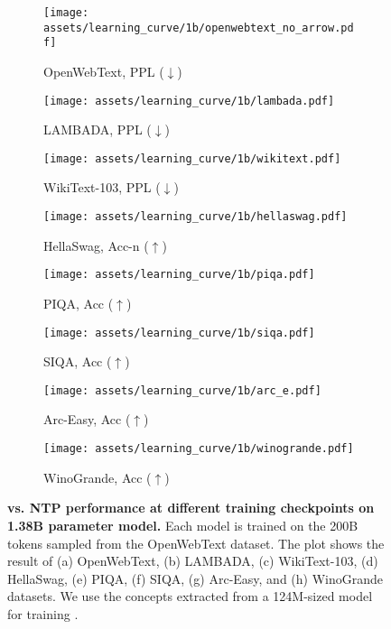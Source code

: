\begin{figure*}[t]
\centering\small

\begin{subfigure}{0.245\textwidth}
    \texttt{[image: assets/learning\_curve/1b/openwebtext\_no\_arrow.pdf]}
    \caption{OpenWebText, PPL ($\downarrow$)}
\end{subfigure}
\begin{subfigure}{0.245\textwidth}
    \texttt{[image: assets/learning\_curve/1b/lambada.pdf]}
    \caption{LAMBADA, PPL ($\downarrow$)}
\end{subfigure}
\begin{subfigure}{0.245\textwidth}
    \texttt{[image: assets/learning\_curve/1b/wikitext.pdf]}
    \caption{WikiText-103, PPL ($\downarrow$)}
\end{subfigure}
\begin{subfigure}{0.245\textwidth}
    \texttt{[image: assets/learning\_curve/1b/hellaswag.pdf]}
    \caption{HellaSwag, Acc-n ($\uparrow$)}
\end{subfigure}
\begin{subfigure}{0.245\textwidth}
    \texttt{[image: assets/learning\_curve/1b/piqa.pdf]}
    \caption{PIQA, Acc ($\uparrow$)}
\end{subfigure}
\begin{subfigure}{0.245\textwidth}
    \texttt{[image: assets/learning\_curve/1b/siqa.pdf]}
    \caption{SIQA, Acc ($\uparrow$)}
\end{subfigure}
\begin{subfigure}{0.245\textwidth}
    \texttt{[image: assets/learning\_curve/1b/arc\_e.pdf]}
    \caption{Arc-Easy, Acc ($\uparrow$)}
\end{subfigure}
\begin{subfigure}{0.245\textwidth}
    \texttt{[image: assets/learning\_curve/1b/winogrande.pdf]}
    \caption{WinoGrande, Acc ($\uparrow$)}
\end{subfigure}
\caption{
\textbf{\sname vs. NTP performance at different training checkpoints on 1.38B parameter model.} Each model is trained on the 200B tokens sampled from the OpenWebText dataset. The plot shows the result of (a) OpenWebText, (b) LAMBADA, (c) WikiText-103, (d) HellaSwag, (e) PIQA, (f) SIQA, (g) Arc-Easy, and (h) WinoGrande datasets. We use the concepts extracted from a 124M-sized model for training \sname.
}
\label{fig:downstream_curve_1b}
\end{figure*}
